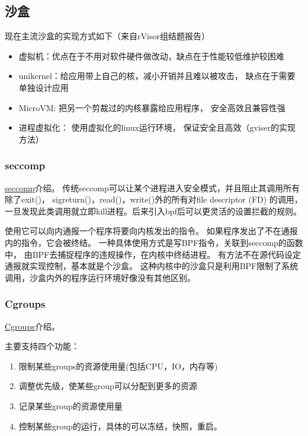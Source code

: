 \documentclass[AutoFakeBold,a4paper]{ctexart}
\begin{document}
\subsection{沙盒}

现在主流沙盒的实现方式如下（来自rVisor组结题报告）

\begin{itemize}
    \item 虚拟机：优点在于不用对软件硬件做改动，缺点在于性能较低维护较困难
    \item unikernel：给应用带上自己的核，减小开销并且难以被攻击，
    缺点在于需要单独设计应用
    \item MicroVM: 把另一个剪裁过的内核暴露给应用程序，
    安全高效且兼容性强
    \item 进程虚拟化：
    使用虚拟化的linux运行环境，
    保证安全且高效（gviser的实现方法）
\end{itemize}

\subsubsection{seccomp}

\href{https://en.wikipedia.org/wiki/Seccomp}{seccomp}介绍。
传统seccomp可以让某个进程进入安全模式，并且阻止其调用所有除了exit()，
sigreturn()，read()，write()外的所有对file descriptor (FD) 的调用，
一旦发现此类调用就立即kill进程。后来引入bpf后可以更灵活的设置拦截的规则。

使用它可以向内通报一个程序将要向内核发出的指令。
如果程序发出了不在通报内的指令，它会被终结。
一种具体使用方式是写BPF指令，关联到seccomp的函数中，
由BPF去捕捉程序的违规操作，在内核中终结进程。
有方法不在源代码设定通报就实现控制，基本就是个沙盒。
这种内核中的沙盒只是利用BPF限制了系统调用，沙盒内外的程序运行环境好像没有其他区别。
\cite{2020SandboxLinux}

\subsubsection{Cgroups}

\href{https://en.wikipedia.org/wiki/Cgroups}{Cgroups}介绍。

主要支持四个功能：
\begin{enumerate}
    \item 限制某些groups的资源使用量(包括CPU，IO，内存等)
    \item 调整优先级，使某些group可以分配到更多的资源
    \item 记录某些group的资源使用量
    \item 控制某些group的运行，具体的可以冻结，快照，重启。
\end{enumerate}
\end{document}
